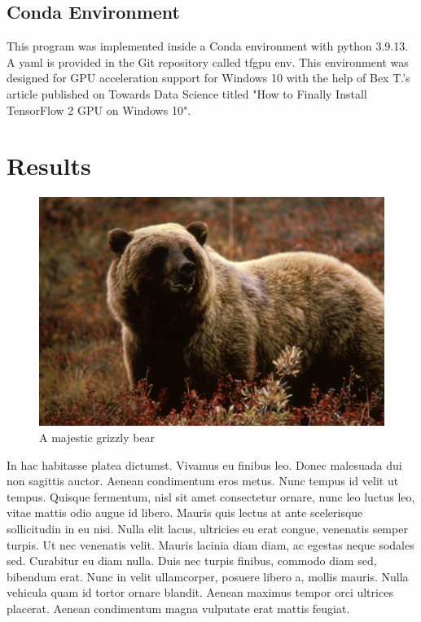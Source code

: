 \documentclass[12pt, a4paper, twocolumn]{article} %
\begin{document}
\subsection{Conda Environment}

This program was implemented inside a Conda environment with python 3.9.13. A yaml is provided in the Git repository called tfgpu env. This environment was designed for GPU acceleration support for Windows 10 with the help of Bex T.'s article published on Towards Data Science titled "How to Finally Install TensorFlow 2 GPU on Windows 10".



\section{Results}

\begin{figure}[H]
	\includegraphics[width=\linewidth]{bear.jpg} %
	\caption{A majestic grizzly bear} %
	\label{bear} %
\end{figure}

In hac habitasse platea dictumst. Vivamus eu finibus leo. Donec malesuada dui non sagittis auctor. Aenean condimentum eros metus. Nunc tempus id velit ut tempus. Quisque fermentum, nisl sit amet consectetur ornare, nunc leo luctus leo, vitae mattis odio augue id libero. Mauris quis lectus at ante scelerisque sollicitudin in eu nisi. Nulla elit lacus, ultricies eu erat congue, venenatis semper turpis. Ut nec venenatis velit. Mauris lacinia diam diam, ac egestas neque sodales sed. Curabitur eu diam nulla. Duis nec turpis finibus, commodo diam sed, bibendum erat. Nunc in velit ullamcorper, posuere libero a, mollis mauris. Nulla vehicula quam id tortor ornare blandit. Aenean maximus tempor orci ultrices placerat. Aenean condimentum magna vulputate erat mattis feugiat.
\end{document}
